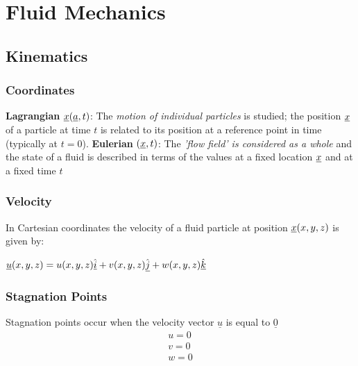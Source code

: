 \section{Fluid Mechanics}
\subsection{Kinematics}
\subsubsection{Coordinates}
\textbf{Lagrangian} $\underline{\boldmath{x}}(\underline{\boldmath{a}},t)$: The \textit{motion of individual particles} is studied; the position $\underline{\boldmath{x}}$ of a particle at time $t$ is related to its position at a reference point in time \underline{} (typically at $t=0$).
\newline
\newline
\textbf{Eulerian} $(\underline{\boldmath{x}},t)$: 
The \textit{'flow field' is considered as a whole} and the state of a fluid is described in terms of the values at a fixed location $\underline{\boldmath{x}}$ and at a fixed time $t$
\subsubsection{Velocity}
In Cartesian coordinates the velocity of a fluid particle at position $\underline{\boldmath{x}}(x,y,z)$ is given by:
\begin{center}
	$\underline{\boldmath{u}}(x,y,z) = u(x,y,z)\underline{\hat{i}} + v(x,y,z)\underline{\hat{j}} + w(x,y,z)\underline{\hat{k}}$
\end{center}
\subsubsection{Stagnation Points}
Stagnation points occur when the velocity vector $\underline{u}$ is equal to $\underline{0}$
\begin{align*}
	u = 0
	\\
	v= 0
	\\
	w= 0
\end{align*}

